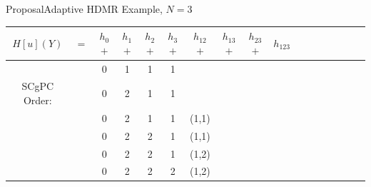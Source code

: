 \documentclass{beamer}
\begin{document}
\begin{frame}{Proposal}{Adaptive HDMR}\vspace{-20pt}
  Example, $N=3$
\begin{table}[h!]\footnotesize
\centering
\begin{tabular}{c c c c c c c c c c c c c c c c c}
    $H[u](Y)$ &$=$ &$h_0$ $+$ &$h_1$ $+$ &$h_2$ $+$ &$h_3$ $+$ &$h_{12}$ $+$ &$h_{13}$ $+$ &$h_{23}$ $+$
    &$h_{123}$ \\\hline
              &    & 0        & 1        & 1        & 1        &             &             &             & \\     
SCgPC Order:  &    & 0        & 2        & 1        & 1        &             &             &             & \\     
              &    & 0        & 2        & 1        & 1        & (1,1)       &             &             & \\     
              &    & 0        & 2        & 2        & 1        & (1,1)       &             &             & \\     
              &    & 0        & 2        & 2        & 1        & (1,2)       &             &             & \\     
              &    & 0        & 2        & 2        & 2        & (1,2)       &             &             &      
\end{tabular}
\end{table}
\end{frame}
\end{document}
